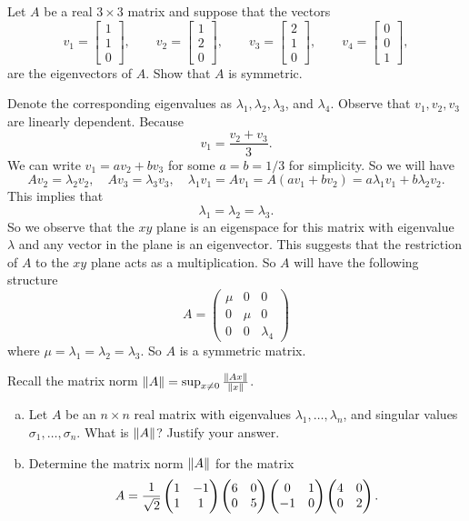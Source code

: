 \begin{problem}
	Let $ A $ be a real $ 3\times 3 $ matrix and suppose that the vectors
	\[ v_1 = \begin{bmatrix}
		1 \\ 1 \\ 0
	\end{bmatrix}, \qquad
	v_2 = \begin{bmatrix}
		1 \\ 2 \\ 0
	\end{bmatrix}, \qquad
	v_3 = \begin{bmatrix}
		2 \\ 1 \\ 0
	\end{bmatrix}, \qquad
	v_4 = \begin{bmatrix}
		0 \\ 0 \\ 1
	\end{bmatrix}, \]
	are the eigenvectors of $ A $. Show that $ A $ is symmetric.
\end{problem}

\begin{solution}
	Denote the corresponding eigenvalues as $ \lambda_1,\lambda_2,\lambda_3 $, and $ \lambda_4 $. Observe that $ v_1,v_2,v_3 $ are linearly dependent. Because 
	\[ v_1 = \frac{v_2+v_3}{3}. \]
	We can write $ v_1 = av_2 + bv_3 $ for some $ a=b=1/3 $ for simplicity. So we will have
	\[ Av_2 = \lambda_2 v_2, \quad Av_3 = \lambda_3 v_3, \quad \lambda_1 v_1 = Av_1= A(av_1+bv_2) = a\lambda_1 v_1 + b\lambda_2v_2. \]
	This implies that
	\[ \lambda_1 = \lambda_2 = \lambda_3. \]
	So we observe that the $ xy $ plane is an eigenspace for this matrix with eigenvalue $ \lambda $ and any vector in the plane is an eigenvector. This suggests that the restriction of $ A $ to the $ xy $ plane acts as a multiplication. So $ A $ will have the following structure
	\[ A = \begin{pmatrix}
		\mu & 0 & 0 \\
		0 & \mu & 0 \\
		0 & 0 & \lambda_4
	\end{pmatrix} \]
	where $ \mu = \lambda_1 = \lambda_2 = \lambda_3 $. So $ A $ is a symmetric matrix.
\end{solution}

\begin{problem}
	Recall the matrix norm $ \norm{A} = \sup_{x\neq 0} \frac{\norm{A x}}{\norm{x}} $.
	\begin{enumerate}[(a)]
		\item Let $ A $ be an $ n\times n $ real matrix with eigenvalues $ \lambda_1,\dots,\lambda_n $, and singular values $ \sigma_1 ,\dots, \sigma_n $. What is $ \norm{A} $? Justify your answer.
		\item Determine the matrix norm $ \norm{A} $ for the matrix 
		\[ A = \frac{1}{\sqrt{2}} \begin{pmatrix} 1 & -1 \\ 1 & 1 \end{pmatrix}\begin{pmatrix} 6 & 0 \\ 0 & 5 \end{pmatrix} \begin{pmatrix} 0 & 1 \\ -1 & 0 \end{pmatrix} \begin{pmatrix} 4 & 0 \\ 0 & 2 \end{pmatrix}. \]
	\end{enumerate}
\end{problem}



